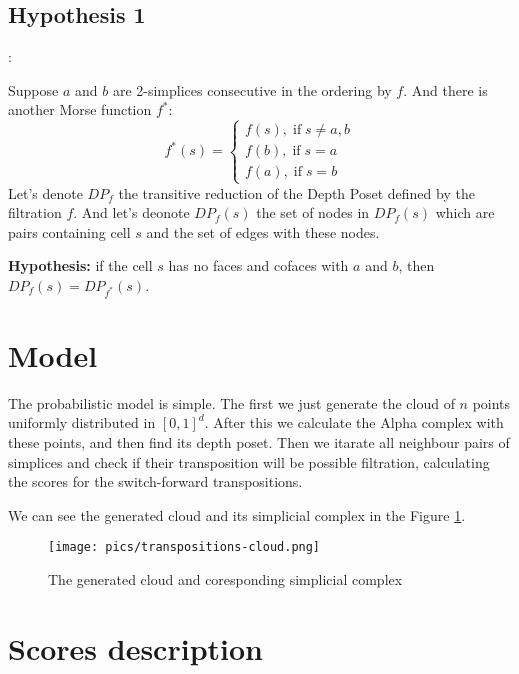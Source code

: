 \documentclass{article}
\begin{document}
\subsection{Hypothesis 1}: 
\par Suppose $a$ and $b$ are 2-simplices consecutive in the ordering by $f$. And there is another Morse function $f^*$: 
$$
f^*(s) = 
\begin{cases}
f(s), \; \text{if} \; s\ne a, b \\
f(b), \; \text{if} \; s = a \\
f(a), \; \text{if} \; s = b
\end{cases}
$$
Let's denote $DP_{f}$ the transitive reduction of the Depth Poset defined by the filtration $f$. And let's deonote $DP_{f}(s)$ the set of nodes in $DP_f(s)$ which are pairs containing cell $s$ and the set of edges with these nodes.

\par \textbf{Hypothesis:} if the cell $s$ has no faces and cofaces with $a$ and $b$, then $DP_f(s) = DP_{f^*}(s)$.


\section{Model}
\par The probabilistic model is simple. The first we just generate the cloud of $n$ points uniformly distributed in $[0, 1]^d$. After this we calculate the Alpha complex with these points, and then find its depth poset. Then we itarate all neighbour pairs of simplices and check if their transposition will be possible filtration, calculating the scores for the switch-forward transpositions.
\par We can see the generated cloud and its simplicial complex in the Figure \ref{fig:cloud}.

\begin{figure}[ht]
\centering
\texttt{[image: pics/transpositions-cloud.png]}
\label{fig:cloud}
\caption{The generated cloud and coresponding simplicial complex}
\end{figure}

\section{Scores description}
\end{document}
